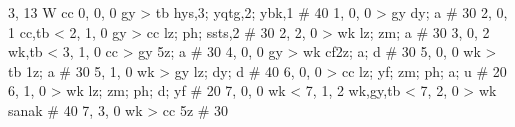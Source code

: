 %
3, 13 %
W %
cc
%
0, 0, 0
gy > tb
hys,3; yqtg,2; ybk,1 # 40
%
1, 0, 0
 > gy
dy; a # 30
%
2, 0, 1
cc,tb < 
%
2, 1, 0
gy > cc
lz; ph; ssts,2 # 30
%
2, 2, 0
 > wk
lz; zm; a # 30
%
3, 0, 2
wk,tb < 
%
3, 1, 0
cc > gy
5z; a # 30
%
4, 0, 0
gy > wk
cf2z; a; d # 30
%
5, 0, 0
wk > tb
1z; a # 30
%
5, 1, 0
wk > gy
lz; dy; d # 40
%
6, 0, 0
 > cc
lz; yf; zm; ph; a; u # 20
%
6, 1, 0
 > wk
lz; zm; ph; d; yf # 20
%
7, 0, 0
wk < 
%
7, 1, 2
wk,gy,tb < 
%
7, 2, 0
 > wk
sanak # 40
%
7, 3, 0
wk > cc
5z # 30